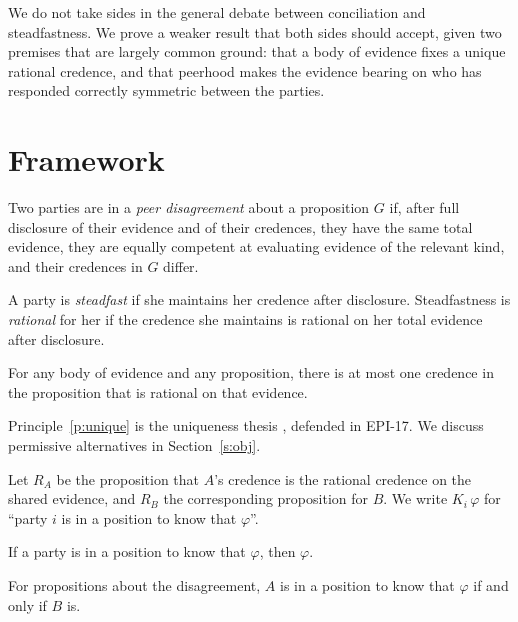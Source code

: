\documentclass{situationist-preprint}
\begin{document}
We do not take sides in the general debate between conciliation and steadfastness. We prove a weaker result that both sides should accept, given two premises that are largely common ground: that a body of evidence fixes a unique rational credence, and that peerhood makes the evidence bearing on who has responded correctly symmetric between the parties.

\section{Framework}

\begin{definition}\label{d:peer}
Two parties are in a \emph{peer disagreement} about a proposition $G$ if, after full disclosure of their evidence and of their credences, they have the same total evidence, they are equally competent at evaluating evidence of the relevant kind, and their credences in $G$ differ.
\end{definition}

\begin{definition}[Steadfastness]\label{d:steadfast}
A party is \emph{steadfast} if she maintains her credence after disclosure. Steadfastness is \emph{rational} for her if the credence she maintains is rational on her total evidence after disclosure.
\end{definition}

\begin{principle}[Uniqueness]\label{p:unique}
For any body of evidence and any proposition, there is at most one credence in the proposition that is rational on that evidence.
\end{principle}

Principle~\ref{p:unique} is the uniqueness thesis \citep{White2005}, defended in EPI-17. We discuss permissive alternatives in Section~\ref{s:obj}.

Let $R_A$ be the proposition that $A$'s credence is the rational credence on the shared evidence, and $R_B$ the corresponding proposition for $B$. We write $K_i\,\varphi$ for \enquote{party $i$ is in a position to know that $\varphi$}.

\begin{assumption}[Factivity]\label{a:factive}
If a party is in a position to know that $\varphi$, then $\varphi$.
\end{assumption}

\begin{assumption}\label{a:shared}
For propositions about the disagreement, $A$ is in a position to know that $\varphi$ if and only if $B$ is.
\end{assumption}
\end{document}
